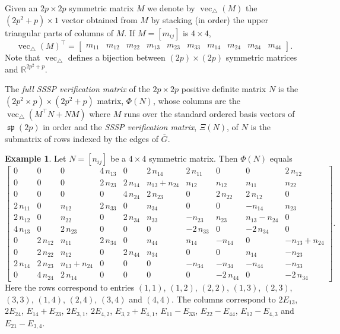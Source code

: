 \documentclass[12pt]{article}
\theoremstyle{definition}
\theoremstyle{definition}
\theoremstyle{definition}
\newtheorem{ex}[thm]{Example}
\numberwithin{figure}{section}
\numberwithin{equation}{section}
\newcommand{\spLA}{\operatorname{\mathfrak{sp}}}
\newcommand{\Gc}{\overline{G}}
\newcommand{\uvec}{\operatorname{vec}_\triangle}
\newcommand{\x}{\times}
\begin{document}
Given an $2p\times 2p$ symmetric matrix $M$ we denote by 
$\uvec(M)$  the $(2p^2+p) \times 1$ vector obtained from $M$ by stacking (in  order) 
the upper triangular parts of columns of $M$.
If $M=[m_{ij}]$ is $4 \times 4$,  
\[ \uvec(M)^\top=
\left[ \begin{array}{cccccccccc}
m_{11} & m_{12}& m_{22}& m_{13} & m_{23} & m_{33} &
m_{14}& m_{24} & m_{34} & m_{44} 
\end{array} \right].
\] 
Note that $\uvec$ defines a bijection 
between  $(2p)\x(2p)$ symmetric matrices and $\mathbb{R}^{2p^2+p}$.

The {\it full SSSP verification matrix} of the $2p\times 2p$ positive definite matrix  $N$ is the  $ (2p^2\times p) \times (2p^2+p)$ matrix, $\Phi(N)$, whose columns are 
the {$\uvec (M^\top N + N M)$ where $M$}  runs over the standard ordered basis vectors of $\spLA(2p)$ {in order}  and the \emph{SSSP verification matrix}, $\Xi(N)$, of $N$ is the submatrix of rows  {indexed} by  the edges of $\Gc$. 

\begin{ex}\label{ex:verify}
Let 
$N=[n_{ij}]$ be  a $4\times 4$ symmetric matrix. 
Then $\Phi(N)$ equals
\[
\scriptscriptstyle{
\left[\begin{array}{cccccccccc}
0 & 0 & 0 & 4 \, n_{13} & 0 & 2 \, n_{14} & 2 \, n_{11} & 0 & 0 & 2 \, n_{12} \\
0 & 0 & 0 & 2 \, n_{23} & 2 \, n_{14} & n_{13} + n_{24} & n_{12} & n_{12} & n_{11} & n_{22} \\
0 & 0 & 0 & 0 & 4 \, n_{24} & 2 \, n_{23} & 0 & 2 \, n_{22} & 2 \, n_{12} & 0 \\
2 \, n_{11} & 0 & n_{12} & 2 \, n_{33} & 0 & n_{34} & 0 & 0 & -n_{14} & n_{23} \\
2 \, n_{12} & 0 & n_{22} & 0 & 2 \, n_{34} & n_{33} & -n_{23} & n_{23} & n_{13} - n_{24} & 0 \\
4 \, n_{13} & 0 & 2 \, n_{23} & 0 & 0 & 0 & -2 \, n_{33} & 0 & -2 \, n_{34} & 0 \\
0 & 2 \, n_{12} & n_{11} & 2 \, n_{34} & 0 & n_{44} & n_{14} & -n_{14} & 0 & -n_{13} + n_{24} \\
0 & 2 \, n_{22} & n_{12} & 0 & 2 \, n_{44} & n_{34} & 0 & 0 & n_{14} & -n_{23} \\
2 \, n_{14} & 2 \, n_{23} & n_{13} + n_{24} & 0 & 0 & 0 & -n_{34} & -n_{34} & -n_{44} & -n_{33} \\
0 & 4 \, n_{24} & 2 \, n_{14} & 0 & 0 & 0 & 0 & -2 \, n_{44} & 0 & -2 \, n_{34}
\end{array}\right]}\displaystyle{.}
\]
Here the rows correspond to entries 
$(1,1)$, 
$(1,2)$, $(2,2)$, 
$(1,3)$, $(2,3)$, $(3,3)$,  $(1,4)$, $(2,4)$, $(3,4)$ and $(4,4)$.
The columns correspond to 
$2E_{13}$, $2E_{24}$, $E_{14}+E_{23}$, $2E_
{3,1}$, $2E_{4,2}$, $E_{3,2}+E_{4,1}$, $E_{11} - E_{33}$, $E_{22}-E_{44}$, $E_{12}- E_{4,3}$ and $E_{21}-E_{3,4}$.

    
\end{ex}
\end{document}
